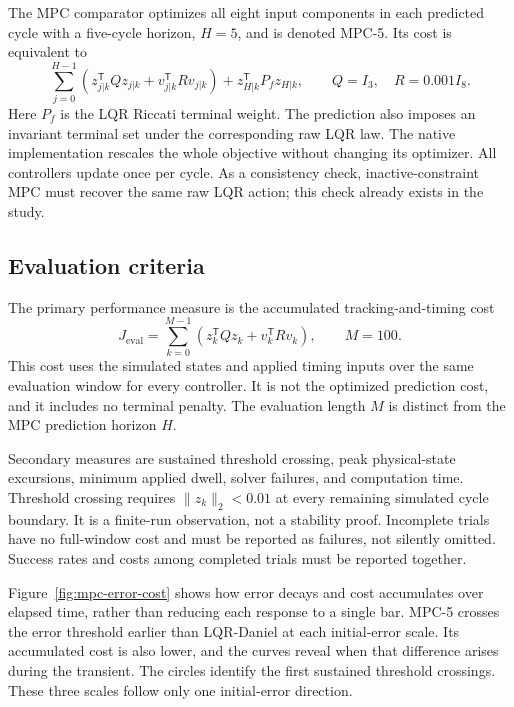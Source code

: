 \documentclass[11pt,a4paper]{article}
\begin{document}
The MPC comparator optimizes all eight input components in each predicted
cycle with a five-cycle horizon, $H=5$, and is denoted MPC-5. Its cost is equivalent to
\[
    \sum_{j=0}^{H-1}
    \left(z_{j|k}^{\mathsf T}Qz_{j|k}
    +v_{j|k}^{\mathsf T}Rv_{j|k}\right)
    +z_{H|k}^{\mathsf T}P_f z_{H|k},
    \qquad Q=I_3,\quad R=0.001 I_8.
\]
Here $P_f$ is the LQR Riccati terminal weight. The prediction also imposes
an invariant terminal set under the corresponding raw LQR law. The native
implementation rescales the whole objective without changing its optimizer.
All controllers update once per cycle. As a consistency check, inactive-constraint
MPC must recover the same raw LQR action; this check already exists in the study.

\subsection{Evaluation criteria}

The primary performance measure is the accumulated tracking-and-timing cost
\begin{equation}
    J_{\mathrm{eval}}=
    \sum_{k=0}^{M-1}
    \left(z_k^{\mathsf T}Qz_k+v_k^{\mathsf T}Rv_k\right),
    \qquad M=100.
    \label{eq:mpc-comparison-evaluation-cost}
\end{equation}
This cost uses the simulated states and applied timing inputs over the same
evaluation window for every controller. It is not the optimized prediction
cost, and it includes no terminal penalty. The evaluation length $M$ is
distinct from the MPC prediction horizon $H$.

Secondary measures are sustained threshold crossing, peak physical-state
excursions, minimum applied dwell, solver failures, and computation time.
Threshold crossing requires $\|z_k\|_2<0.01$ at every remaining simulated
cycle boundary. It is a finite-run observation, not a stability proof.
Incomplete trials have no full-window cost and must be reported as failures,
not silently omitted. Success rates and costs among completed trials must be
reported together.

Figure~\ref{fig:mpc-error-cost} shows how error decays and cost accumulates
over elapsed time, rather than reducing each response to a single bar.
MPC-5 crosses the error threshold earlier than LQR-Daniel at each initial-error
scale. Its accumulated cost is also lower, and the curves reveal when that
difference arises during the transient. The circles identify the first sustained
threshold crossings. These three scales follow only one initial-error direction.
\end{document}
